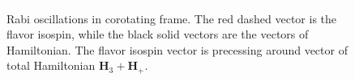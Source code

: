 
\begin{figure}
        \centering
        \includegraphics[width=\columnwidth, trim={20cm 10cm 50cm 10cm},clip]{chapters/assets/rabi/rabi-isospin-rotating-frame}
    \caption{Rabi oscillations in corotating frame. The red dashed vector is the flavor isospin, while the black solid vectors are the vectors of Hamiltonian. The flavor isospin vector is precessing around vector of total Hamiltonian $\mathbf{H}_3+\mathbf{H}_+$.}
    \label{fig-rabi-isospin-rotating-frame}
\end{figure}

